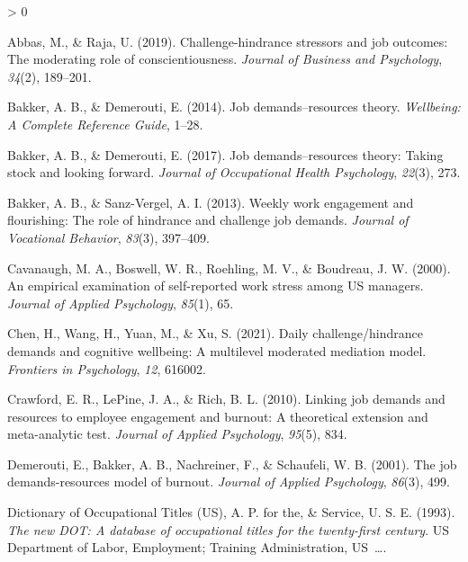 \documentclass[
  english,
  man]{apa6}
\newlength{\cslhangindent}
\newenvironment{CSLReferences}[2] %
 {%
  \setlength{\parindent}{0pt}
  \ifodd #1 \everypar{\setlength{\hangindent}{\cslhangindent}}\ignorespaces\fi
  \ifnum #2 > 0
  \setlength{\parskip}{#2\baselineskip}
  \fi
 }%
 {}
\begin{document}
\hypertarget{refs}{}
\begin{CSLReferences}{1}{0}
\leavevmode\hypertarget{ref-abbas2019challenge}{}%
Abbas, M., \& Raja, U. (2019). Challenge-hindrance stressors and job outcomes: The moderating role of conscientiousness. \emph{Journal of Business and Psychology}, \emph{34}(2), 189--201.

\leavevmode\hypertarget{ref-bakker2014job}{}%
Bakker, A. B., \& Demerouti, E. (2014). Job demands--resources theory. \emph{Wellbeing: A Complete Reference Guide}, 1--28.

\leavevmode\hypertarget{ref-bakker2017job}{}%
Bakker, A. B., \& Demerouti, E. (2017). Job demands--resources theory: Taking stock and looking forward. \emph{Journal of Occupational Health Psychology}, \emph{22}(3), 273.

\leavevmode\hypertarget{ref-bakker2013weekly}{}%
Bakker, A. B., \& Sanz-Vergel, A. I. (2013). Weekly work engagement and flourishing: The role of hindrance and challenge job demands. \emph{Journal of Vocational Behavior}, \emph{83}(3), 397--409.

\leavevmode\hypertarget{ref-cavanaugh2000empirical}{}%
Cavanaugh, M. A., Boswell, W. R., Roehling, M. V., \& Boudreau, J. W. (2000). An empirical examination of self-reported work stress among US managers. \emph{Journal of Applied Psychology}, \emph{85}(1), 65.

\leavevmode\hypertarget{ref-chen2021daily}{}%
Chen, H., Wang, H., Yuan, M., \& Xu, S. (2021). Daily challenge/hindrance demands and cognitive wellbeing: A multilevel moderated mediation model. \emph{Frontiers in Psychology}, \emph{12}, 616002.

\leavevmode\hypertarget{ref-crawford2010linking}{}%
Crawford, E. R., LePine, J. A., \& Rich, B. L. (2010). Linking job demands and resources to employee engagement and burnout: A theoretical extension and meta-analytic test. \emph{Journal of Applied Psychology}, \emph{95}(5), 834.

\leavevmode\hypertarget{ref-demerouti2001job}{}%
Demerouti, E., Bakker, A. B., Nachreiner, F., \& Schaufeli, W. B. (2001). The job demands-resources model of burnout. \emph{Journal of Applied Psychology}, \emph{86}(3), 499.

\leavevmode\hypertarget{ref-advisory1993new}{}%
Dictionary of Occupational Titles (US), A. P. for the, \& Service, U. S. E. (1993). \emph{The new DOT: A database of occupational titles for the twenty-first century}. US Department of Labor, Employment; Training Administration, US~\ldots.


\end{CSLReferences}
\end{document}

